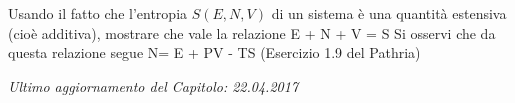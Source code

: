 
\begin{Exercise}[label={ex:02-Saddit}, title={Estensività dell'entropia}]
Usando il fatto che l'entropia $S(E,N,V)$ di un sistema è una quantità estensiva (cioè additiva), mostrare che vale la relazione
\be
E + N + V = S
\ee
Si osservi che da questa relazione segue
\be
N\mu = E + PV - TS
\ee
(Esercizio 1.9 del Pathria)
\end{Exercise}


\vskip 0.75cm
\begin{flushright}
{\em Ultimo aggiornamento del Capitolo: 22.04.2017}
\end{flushright}
